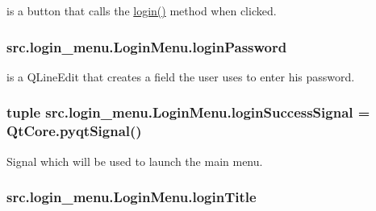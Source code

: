 is a button that calls the \hyperlink{classsrc_1_1login__menu_1_1_login_menu_a75303935e17e43388fd4ef3df029944e}{login()} method when clicked. 

\hypertarget{classsrc_1_1login__menu_1_1_login_menu_a6c0c5ab8b48e62ccb26a472e6e7790c9}{}
\subsubsection[{login\+Password}]{\setlength{\rightskip}{0pt plus 5cm}src.\+login\+\_\+menu.\+Login\+Menu.\+login\+Password}\label{classsrc_1_1login__menu_1_1_login_menu_a6c0c5ab8b48e62ccb26a472e6e7790c9}


is a Q\+Line\+Edit that creates a field the user uses to enter his password. 

\hypertarget{classsrc_1_1login__menu_1_1_login_menu_a0c7d684b7c11fd92f8de9beee9cf2a9f}{}
\subsubsection[{login\+Success\+Signal}]{\setlength{\rightskip}{0pt plus 5cm}tuple src.\+login\+\_\+menu.\+Login\+Menu.\+login\+Success\+Signal = Qt\+Core.\+pyqt\+Signal()\hspace{0.3cm}{\ttfamily [static]}}\label{classsrc_1_1login__menu_1_1_login_menu_a0c7d684b7c11fd92f8de9beee9cf2a9f}


Signal which will be used to launch the main menu. 

\hypertarget{classsrc_1_1login__menu_1_1_login_menu_adce86324539cbf7d5a398d8afba6a439}{}
\subsubsection[{login\+Title}]{\setlength{\rightskip}{0pt plus 5cm}src.\+login\+\_\+menu.\+Login\+Menu.\+login\+Title}\label{classsrc_1_1login__menu_1_1_login_menu_adce86324539cbf7d5a398d8afba6a439}


